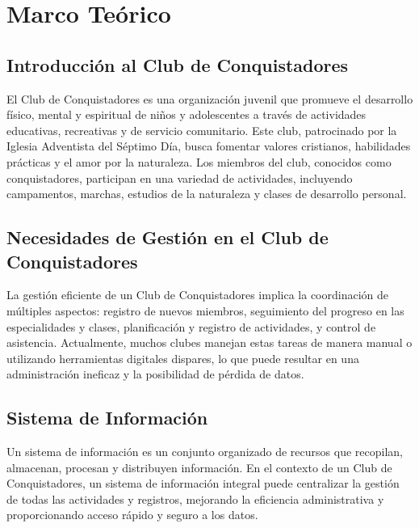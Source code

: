 \documentclass[stu, 12pt, letterpaper, donotrepeattitle, floatsintext, natbib]{apa7}
\begin{document}
\section{Marco Te\'orico}

\subsection{Introducci\'on al Club de Conquistadores}
El Club de Conquistadores es una organizaci\'on juvenil que promueve el
desarrollo f\'isico, mental y espiritual de ni\~{n}os y adolescentes a trav\'es
de actividades educativas, recreativas y de servicio comunitario. Este club,
patrocinado por la Iglesia Adventista del S\'eptimo D\'ia, busca fomentar
valores cristianos, habilidades pr\'acticas y el amor por la naturaleza. Los
miembros del club, conocidos como conquistadores, participan en una variedad de
actividades, incluyendo campamentos, marchas, estudios de la naturaleza y
clases de desarrollo personal.

\subsection{Necesidades de Gesti\'on en el Club de Conquistadores}
La gesti\'on eficiente de un Club de Conquistadores implica la coordinaci\'on
de m\'ultiples aspectos: registro de nuevos miembros, seguimiento del progreso
en las especialidades y clases, planificaci\'on y registro de actividades, y
control de asistencia. Actualmente, muchos clubes manejan estas tareas de
manera manual o utilizando herramientas digitales dispares, lo que puede
resultar en una administraci\'on ineficaz y la posibilidad de p\'erdida de
datos.

\subsection{Sistema de Informaci\'on}
Un sistema de informaci\'on es un conjunto organizado de recursos que
recopilan, almacenan, procesan y distribuyen informaci\'on. En el contexto de
un Club de Conquistadores, un sistema de informaci\'on integral puede
centralizar la gesti\'on de todas las actividades y registros, mejorando la
eficiencia administrativa y proporcionando acceso r\'apido y seguro a los
datos.
\end{document}
